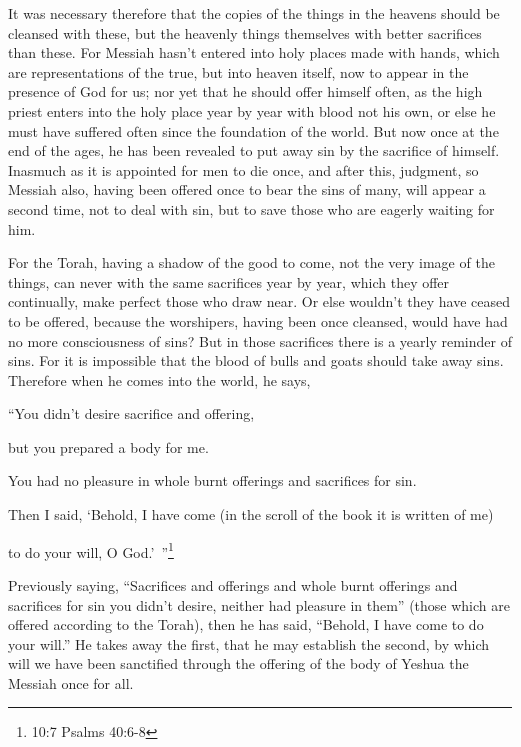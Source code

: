 \myverse{}It was necessary therefore that the copies of the things in the
heavens should be cleansed with these, but the heavenly things themselves with better sacrifices than
these.
\myverse{}For Messiah hasn’t entered into holy places made with hands, which are representations
of the true, but into heaven itself, now to appear in the presence of God for us;
\myverse{}nor yet that he should offer himself often, as the high priest enters into
the holy place year by year with blood not his own,
\myverse{}or else he must have suffered often since the foundation of the world. But
now once at the end of the ages, he has been revealed to put away sin by the sacrifice of himself.
\myverse{}Inasmuch as it is appointed for men to die once, and after this, judgment,
\myverse{}so Messiah also, having been offered once to bear the sins of many, will appear
a second time, not to deal with sin, but to save those who are eagerly waiting for him.


\mychapter{} \myverse*{}For the Torah, having a shadow of the good to come, not the very
image of the things, can never with the same sacrifices year by year, which they offer continually, make
perfect those who draw near.
\myverse{}Or else wouldn’t they have ceased to be offered, because the worshipers, having
been once cleansed, would have had no more consciousness of sins?
\myverse{}But in those sacrifices there is a yearly reminder of sins.
\myverse{}For it is impossible that the blood of bulls and goats should take away sins.
\myverse{}Therefore when he comes into the world, he says,

“You didn’t desire sacrifice and offering,

but you prepared a body for me.

\myverse{}You had no pleasure in whole burnt offerings and sacrifices for
sin.

\myverse{}Then I said, ‘Behold, I have come (in the scroll of
the book it is written of me)

to do your will, O God.’ ”\footnote{10:7 Psalms 40:6-8}

\myverse{}Previously saying, “Sacrifices and offerings and whole burnt offerings
and sacrifices for sin you didn’t desire, neither had pleasure in them” (those which are offered according to the Torah),
\myverse{}then he has said, “Behold, I have come to do your will.” He takes away the
first, that he may establish the second,
\myverse{}by which will we have been sanctified through the offering of the body of
Yeshua the Messiah once for all.

